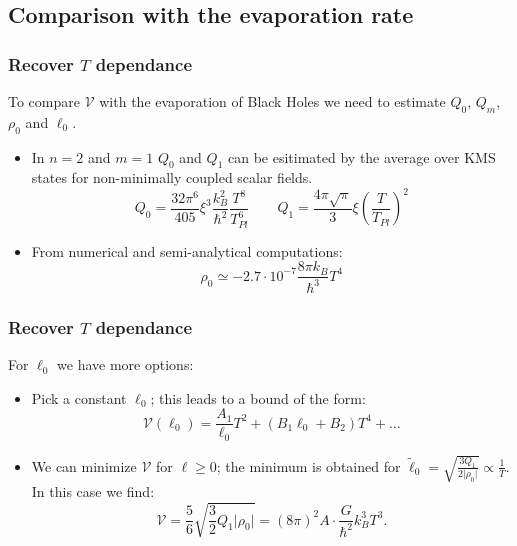 \documentclass[handout]{beamer}
\begin{document}
	\subsection{Comparison with the evaporation rate}
	\begin{frame}
		\frametitle{Recover \(T\) dependance}
		To compare \(\mathcal{V}\) with the evaporation of Black Holes we need to estimate \(Q_0\), \(Q_m\), \(\rho_0\) and \(\ell_0\).
		\begin{itemize}
			\item In \(n = 2\) and \(m = 1\) \(Q_0\) and \(Q_1\) can be esitimated by the average over KMS states for non-minimally coupled scalar fields.
			\[
			Q_0 = \frac{32\pi^6}{405}\xi^3 \frac{k_B^2}{\hbar^2}\frac{T^8}{T_{Pl}^6} \quad \quad
			Q_1 = \frac{4\pi\sqrt{\pi}}{3}\xi \left(\frac{T}{T_{Pl}}\right)^2
			\]
			\item From numerical and semi-analytical computations:
			\[
			\rho_0 \simeq -2.7 \cdot 10^{-7} \frac{8\pi k_B}{\hbar^3} T^4	
			\]
		\end{itemize}
	\end{frame}

	\begin{frame}
		\frametitle{Recover \(T\) dependance}
		For \(\ell_0\) we have more options:
		\begin{itemize}
			\item Pick a constant \(\ell_0\); this leads to a bound of the form:
			\[
			\mathcal{V}(\ell_0) = \frac{A_1}{\ell_0}T^2 + (B_1\ell_0 + B_2)T^4 + \ldots
			\]
			\item We can minimize \(\mathcal{V}\) for \(\ell \ge 0\); the minimum is obtained for \(\tilde{\ell}_0 = \sqrt{\frac{3Q_1}{2\vert\rho_0\vert}} \propto \frac{1}{T}\). In this case we find:
			\[
			\mathcal{V}	= \frac{5}{6}\sqrt{\frac{3}{2}Q_1\vert\rho_0\vert} = (8\pi)^2A \cdot \frac{G}{\hbar^2} k_B^3 T^3. 
			\]
		\end{itemize}
	\end{frame}
\end{document}

